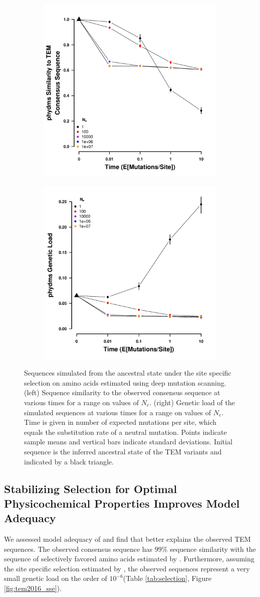 \documentclass[12pt]{article}
\begin{document}
\begin{figure}[h]
    \centering
    \begin{subfigure}
        \centering
        \includegraphics[width=.45\textwidth]{img/simulated_dist_time_DMS_ancest.pdf}
    \end{subfigure}
    \begin{subfigure}
        \centering
        \includegraphics[width=.45\textwidth]{img/simulated_gl_time_DMS_ancest.pdf}
    \end{subfigure}
    \caption{Sequences simulated from the ancestral state under the site specific selection on amino acids estimated using deep mutation scanning. 
    (left) Sequence similarity to the observed consensus sequence at various times for a range on values of $N_e$.
    (right) Genetic load of the simulated sequences at various times for a range on values of $N_e$.
    Time is given in number of expected mutations per site, which equals the substitution rate of a neutral mutation.
    Points indicate sample means and vertical bars indicate standard deviations. Initial sequence is the inferred ancestral state of the TEM variants and indicated by a black triangle.}
    \label{fig:dms_sim}
\end{figure}

\subsection*{Stabilizing Selection for Optimal Physicochemical Properties Improves Model Adequacy} 
We assessed model adequacy of \selac and find that \selac better explains the observed TEM sequences.
The observed consensus sequence has $99 \%$ sequence similarity with the sequence of selectively favored amino acids estimated by \selac.
Furthermore, assuming the site specific selection estimated by \selac, the observed sequences represent a very small genetic load on the order of $10^{-6}$(Table \ref{tab:selection}, Figure \ref{fig:tem2016_sse}).
\end{document}
